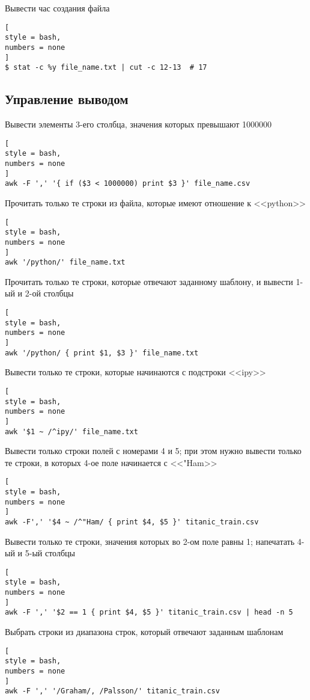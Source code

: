 \documentclass[%
	11pt,
	a4paper,
	utf8,
		]{article}
\begin{document}
Вывести час создания файла
\begin{lstlisting}[
style = bash,
numbers = none
]
$ stat -c %y file_name.txt | cut -c 12-13  # 17
\end{lstlisting}

\subsection{Управление выводом}

Вывести элементы 3-его столбца, значения которых превышают 1000000
\begin{lstlisting}[
style = bash,
numbers = none
]
awk -F ',' '{ if ($3 < 1000000) print $3 }' file_name.csv
\end{lstlisting}

Прочитать только те строки из файла, которые имеют отношение к <<python>>
\begin{lstlisting}[
style = bash,
numbers = none
]
awk '/python/' file_name.txt
\end{lstlisting}

Прочитать только те строки, которые отвечают заданному шаблону, и вывести 1-ый и 2-ой столбцы
\begin{lstlisting}[
style = bash,
numbers = none
]
awk '/python/ { print $1, $3 }' file_name.txt
\end{lstlisting}

Вывести только те строки, которые начинаются с подстроки <<ipy>>
\begin{lstlisting}[
style = bash,
numbers = none
]
awk '$1 ~ /^ipy/' file_name.txt
\end{lstlisting}

Вывести только строки полей с номерами 4 и 5; при этом нужно вывести только те строки, в которых 4-ое поле начинается с <<"Ham>>
\begin{lstlisting}[
style = bash,
numbers = none
]
awk -F',' '$4 ~ /^"Ham/ { print $4, $5 }' titanic_train.csv
\end{lstlisting}

Вывести только те строки, значения которых во 2-ом поле равны 1; напечатать 4-ый и 5-ый столбцы
\begin{lstlisting}[
style = bash,
numbers = none
]
awk -F ',' '$2 == 1 { print $4, $5 }' titanic_train.csv | head -n 5
\end{lstlisting}

Выбрать строки из диапазона строк, который отвечают заданным шаблонам
\begin{lstlisting}[
style = bash,
numbers = none
]
awk -F ',' '/Graham/, /Palsson/' titanic_train.csv
\end{lstlisting}
\end{document}
